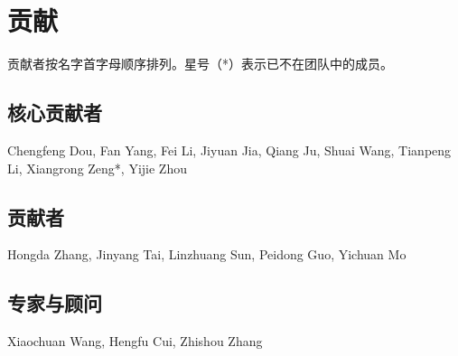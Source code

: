 \section{贡献}

贡献者按名字首字母顺序排列。星号（*）表示已不在团队中的成员。

\subsection*{核心贡献者}

Chengfeng Dou, 
Fan Yang, 
Fei Li, 
Jiyuan Jia, 
Qiang Ju, 
Shuai Wang, 
Tianpeng Li, 
Xiangrong Zeng*, 
Yijie Zhou

\subsection*{贡献者}

Hongda Zhang, 
Jinyang Tai, 
Linzhuang Sun, 
Peidong Guo, 
Yichuan Mo

\subsection*{专家与顾问}

Xiaochuan Wang,
Hengfu Cui, 
Zhishou Zhang
